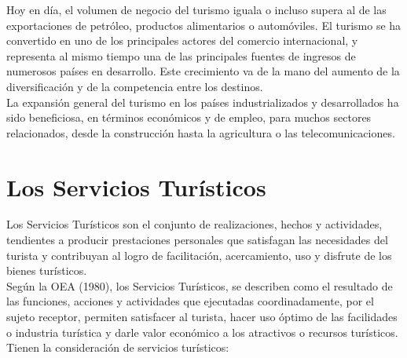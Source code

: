 Hoy en día, el volumen de negocio del turismo iguala o incluso supera al de las exportaciones de petróleo, productos alimentarios o automóviles. El turismo se ha convertido en uno de los principales actores del comercio internacional, y representa al mismo tiempo una de las principales fuentes de ingresos de numerosos países en desarrollo. Este crecimiento va de la mano del aumento de la diversificación y de la competencia entre los destinos.\\

La expansión general del turismo en los países industrializados y desarrollados ha sido beneficiosa, en términos económicos y de empleo, para muchos sectores relacionados, desde la construcción hasta la agricultura o las telecomunicaciones.





\section{Los Servicios Turísticos}



Los Servicios Turísticos son el conjunto de  realizaciones, hechos y actividades, tendientes a producir prestaciones personales que satisfagan las necesidades del turista y contribuyan al logro de facilitación, acercamiento, uso y disfrute de los bienes turísticos. \\

Según la OEA (1980), los Servicios Turísticos, se describen como el resultado de las funciones, acciones y actividades que ejecutadas coordinadamente, por el sujeto receptor, permiten satisfacer al turista, hacer uso óptimo de las facilidades o industria turística y darle valor económico a los atractivos o recursos turísticos.\\

Tienen la consideración de servicios turísticos:

